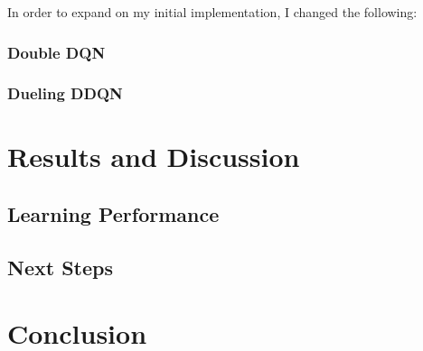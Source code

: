 \documentclass[11pt]{article}
\begin{document}
In order to expand on my initial implementation, I changed the following:

\subsubsection{Double DQN}


\subsubsection{Dueling DDQN}

\FloatBarrier

\begin{figure}[!ht]
    \centering
    \caption{}
    \label{fig:dueling-architecture}
\end{figure}

\FloatBarrier

\section{Results and Discussion}


\subsection{Learning Performance}

\FloatBarrier

\begin{figure}[!ht]
	\centering
	\caption{}
	\label{fig:dqn}
\end{figure}

\FloatBarrier


\subsection{Next Steps}





\section{Conclusion}






\end{document}
